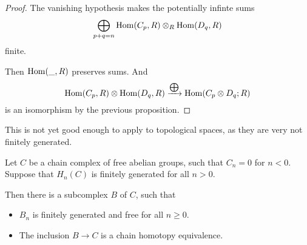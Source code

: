 \documentclass[language=english]{TemplateLecture}
\begin{document}
\begin{proof}
    The vanishing hypothesis makes the potentially infinte sums
    \[\bigoplus_{p+q = n} \operatorname{Hom}(C_p, R) \otimes_R \operatorname{Hom}(D_q, R)\]
    finite.

    Then \(\operatorname{Hom}(\_, R)\) preserves sums. And
    \[\operatorname{Hom}(C_p, R) \otimes \operatorname{Hom}(D_q,R) \xrightarrow{\bigoplus} \operatorname{Hom}(C_p \otimes D_q; R)\]
    is an isomorphism by the previous proposition.
\end{proof}

This is not yet good enough to apply to topological spaces, as they are very not finitely generated.

\begin{proposition}
    Let \(C\) be a chain complex of free abelian groups, such that  \(C_n = 0\) for \(n < 0\). Suppose that \(H_n(C)\) is finitely generated for all \(n > 0\).

    Then there is a subcomplex \(B\) of \(C\), such that
    \begin{itemize}
        \item \(B_n\) is finitely generated and free for all \(n \geq 0\).
        \item The inclusion \(B \to C\) is a chain homotopy equivalence.
    \end{itemize}
\end{proposition}
\end{document}
